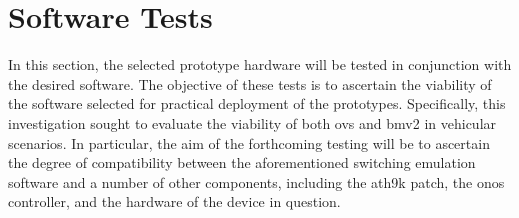 \chapter{Software Tests}
\label{cha:software_tests}

In this section, the selected prototype hardware will be tested in conjunction with the desired software. The objective of these tests is to ascertain the viability of the software selected for practical deployment of the prototypes. Specifically, this investigation sought to evaluate the viability of both \gls{ovs} and \gls{bmv2} in vehicular scenarios. In particular, the aim of the forthcoming testing will be to ascertain the degree of compatibility between the aforementioned switching emulation software and a number of other components, including the ath9k patch, the \gls{onos} controller, and the hardware of the device in question.


